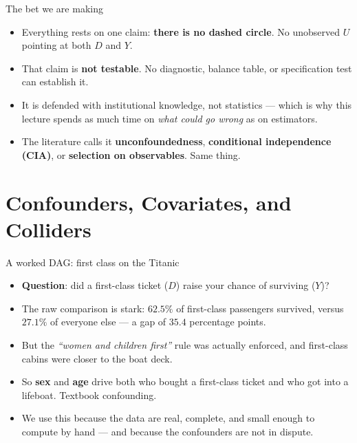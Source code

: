 \documentclass[
  11pt,
  ignorenonframetext,
  aspectratio=169,
]{beamer}
\providecommand{\tightlist}{%
  \setlength{\itemsep}{0pt}\setlength{\parskip}{0pt}}
\begin{document}
\begin{frame}{The bet we are making}
\protect{}\label{the-bet-we-are-making}
\begin{center}
\end{center}

\begin{itemize}
\tightlist
\item
  Everything rests on one claim: \textbf{there is no dashed circle}. No
  unobserved \(U\) pointing at both \(D\) and \(Y\).
\item
  That claim is \textbf{not testable}. No diagnostic, balance table, or
  specification test can establish it.
\item
  It is defended with institutional knowledge, not statistics --- which
  is why this lecture spends as much time on \emph{what could go wrong}
  as on estimators.
\item
  The literature calls it \textbf{unconfoundedness}, \textbf{conditional
  independence (CIA)}, or \textbf{selection on observables}. Same thing.
\end{itemize}
\end{frame}

\section{Confounders, Covariates, and
Colliders}\label{confounders-covariates-and-colliders}

\begin{frame}{A worked DAG: first class on the Titanic}
\protect{}\label{a-worked-dag-first-class-on-the-titanic}
\begin{itemize}
\tightlist
\item
  \textbf{Question}: did a first-class ticket (\(D\)) raise your chance
  of surviving (\(Y\))?
\item
  The raw comparison is stark: \(62.5\%\) of first-class passengers
  survived, versus \(27.1\%\) of everyone else --- a gap of \(35.4\)
  percentage points.
\item
  But the \emph{``women and children first''} rule was actually
  enforced, and first-class cabins were closer to the boat deck.
\item
  So \textbf{sex} and \textbf{age} drive both who bought a first-class
  ticket and who got into a lifeboat. Textbook confounding.
\item
  We use this because the data are real, complete, and small enough to
  compute by hand --- and because the confounders are not in dispute.
\end{itemize}
\end{frame}
\end{document}
